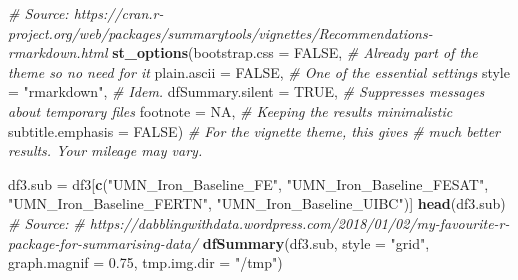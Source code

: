 \documentclass[
]{article}
\newenvironment{Shaded}{\begin{snugshade}}{\end{snugshade}}
\newcommand{\CommentTok}[1]{\textcolor[rgb]{0.56,0.35,0.01}{\textit{#1}}}
\newcommand{\DataTypeTok}[1]{\textcolor[rgb]{0.13,0.29,0.53}{#1}}
\newcommand{\FloatTok}[1]{\textcolor[rgb]{0.00,0.00,0.81}{#1}}
\newcommand{\KeywordTok}[1]{\textcolor[rgb]{0.13,0.29,0.53}{\textbf{#1}}}
\newcommand{\NormalTok}[1]{#1}
\newcommand{\OperatorTok}[1]{\textcolor[rgb]{0.81,0.36,0.00}{\textbf{#1}}}
\newcommand{\OtherTok}[1]{\textcolor[rgb]{0.56,0.35,0.01}{#1}}
\newcommand{\StringTok}[1]{\textcolor[rgb]{0.31,0.60,0.02}{#1}}
\begin{document}
\begin{Shaded}
\begin{Highlighting}[]
\CommentTok{# Source: https://cran.r-project.org/web/packages/summarytools/vignettes/Recommendations-rmarkdown.html}
\KeywordTok{st_options}\NormalTok{(}\DataTypeTok{bootstrap.css     =} \OtherTok{FALSE}\NormalTok{,       }\CommentTok{# Already part of the theme so no need for it}
           \DataTypeTok{plain.ascii       =} \OtherTok{FALSE}\NormalTok{,       }\CommentTok{# One of the essential settings}
           \DataTypeTok{style             =} \StringTok{"rmarkdown"}\NormalTok{, }\CommentTok{# Idem.}
           \DataTypeTok{dfSummary.silent  =} \OtherTok{TRUE}\NormalTok{,        }\CommentTok{# Suppresses messages about temporary files}
           \DataTypeTok{footnote          =} \OtherTok{NA}\NormalTok{,          }\CommentTok{# Keeping the results minimalistic}
           \DataTypeTok{subtitle.emphasis =} \OtherTok{FALSE}\NormalTok{)       }\CommentTok{# For the vignette theme, this gives}
                                            \CommentTok{# much better results. Your mileage may vary.}
\end{Highlighting}
\end{Shaded}

\begin{Shaded}
\begin{Highlighting}[]
\NormalTok{df3.sub =}\StringTok{ }\NormalTok{df3[}\KeywordTok{c}\NormalTok{(}\StringTok{"UMN_Iron_Baseline_FE"}\NormalTok{, }\StringTok{"UMN_Iron_Baseline_FESAT"}\NormalTok{, }\StringTok{"UMN_Iron_Baseline_FERTN"}\NormalTok{, }
    \StringTok{"UMN_Iron_Baseline_UIBC"}\NormalTok{)]}
\KeywordTok{head}\NormalTok{(df3.sub)}
\CommentTok{# Source:}
\CommentTok{# https://dabblingwithdata.wordpress.com/2018/01/02/my-favourite-r-package-for-summarising-data/}
\KeywordTok{dfSummary}\NormalTok{(df3.sub, }\DataTypeTok{style =} \StringTok{"grid"}\NormalTok{, }\DataTypeTok{graph.magnif =} \FloatTok{0.75}\NormalTok{, }\DataTypeTok{tmp.img.dir =} \StringTok{"/tmp"}\NormalTok{)}
\end{Highlighting}
\end{Shaded}

\begin{Shaded}
\end{Shaded}
\end{document}
